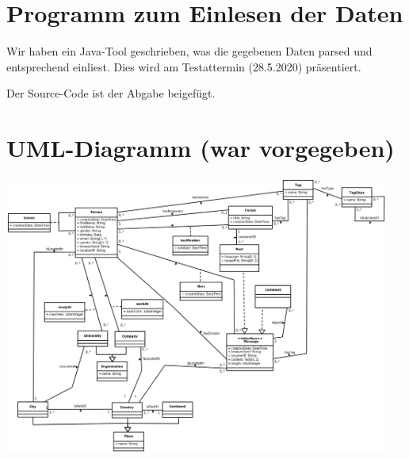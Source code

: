 \section{Programm zum Einlesen der Daten}

Wir haben ein Java-Tool geschrieben, was die gegebenen Daten parsed und entsprechend einliest.
Dies wird am Testattermin (28.5.2020) präsentiert.

Der Source-Code ist der Abgabe beigefügt.

\section{UML-Diagramm (war vorgegeben)}
\includegraphics[angle=90,width=0.95\textwidth]{img/schema.png}


